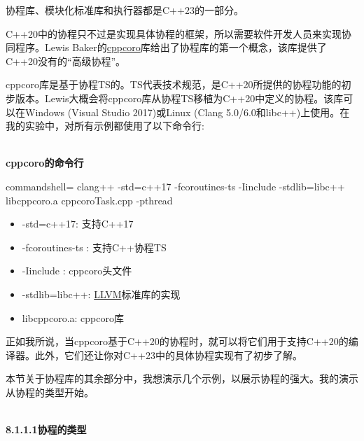 协程库、模块化标准库和执行器都是C++23的一部分。



C++20中的协程只不过是实现具体协程的框架，所以需要软件开发人员来实现协同程序。Lewis Baker的\href{https://github.com/lewissbaker/cppcoro}{cppcoro}库给出了协程库的第一个概念，该库提供了C++20没有的“高级协程”。

\begin{tcolorbox}[breakable,enhanced jigsaw,colback=blue!5!white,colframe=blue!75!black,title={使用cppcoro}]
	
cppcoro库是基于协程TS的。TS代表技术规范，是C++20所提供的协程功能的初步版本。Lewis大概会将cppcoro库从协程TS移植为C++20中定义的协程。该库可以在Windows (Visual Studio 2017)或Linux (Clang 5.0/6.0和libc++)上使用。在我的实验中，对所有示例都使用了以下命令行:

\hspace*{\fill} \\ %
\noindent
\textbf{cppcoro的命令行}
\begin{tcblisting}{commandshell={}}
clang++ -std=c++17 -fcoroutines-ts -Iinclude -stdlib=libc++ libcppcoro.a
  cppcoroTask.cpp -pthread
\end{tcblisting}

\begin{itemize}
\item 
-std=c++17: 支持C++17

\item 
-fcoroutines-ts : 支持C++协程TS

\item 
-Iinclude : cppcoro头文件

\item 
-stdlib=libc++: \href{https://en.wikipedia.org/wiki/LLVM}{LLVM}标准库的实现

\item 
libcppcoro.a: cppcoro库
\end{itemize}

正如我所说，当cppcoro基于C++20的协程时，就可以将它们用于支持C++20的编译器。此外，它们还让你对C++23中的具体协程实现有了初步了解。

本节关于协程库的其余部分中，我想演示几个示例，以展示协程的强大。我的演示从协程的类型开始。

\end{tcolorbox}

\hspace*{\fill} \\ %
\noindent
\textbf{8.1.1.1\hspace{0.2cm}协程的类型}

